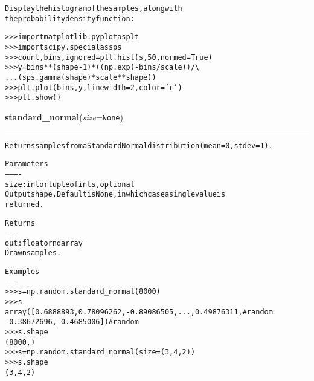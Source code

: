 \begin{boxedminipage}{\funcwidth}
\begin{alltt}
Display the histogram of the samples, along with
the probability density function:

{\textgreater}{\textgreater}{\textgreater} import matplotlib.pyplot as plt
{\textgreater}{\textgreater}{\textgreater} import scipy.special as sps
{\textgreater}{\textgreater}{\textgreater} count, bins, ignored = plt.hist(s, 50, normed=True)
{\textgreater}{\textgreater}{\textgreater} y = bins**(shape-1) * ((np.exp(-bins/scale))/ {\textbackslash}
...                       (sps.gamma(shape) * scale**shape))
{\textgreater}{\textgreater}{\textgreater} plt.plot(bins, y, linewidth=2, color='r')
{\textgreater}{\textgreater}{\textgreater} plt.show()
\end{alltt}

\setlength{\parskip}{1ex}
    \end{boxedminipage}

    \label{QSTK:qstklearn:mldiagnostics:standard_normal}

    \vspace{0.5ex}

\hspace{.8\funcindent}\begin{boxedminipage}{\funcwidth}

    \raggedright \textbf{standard\_normal}(\textit{size}={\tt None})

    \vspace{-1.5ex}

    \rule{\textwidth}{0.5\fboxrule}
\setlength{\parskip}{2ex}
\begin{alltt}
Returns samples from a Standard Normal distribution (mean=0, stdev=1).

Parameters
----------
size : int or tuple of ints, optional
    Output shape. Default is None, in which case a single value is
    returned.

Returns
-------
out : float or ndarray
    Drawn samples.

Examples
--------
{\textgreater}{\textgreater}{\textgreater} s = np.random.standard\_normal(8000)
{\textgreater}{\textgreater}{\textgreater} s
array([ 0.6888893 ,  0.78096262, -0.89086505, ...,  0.49876311, \#random
       -0.38672696, -0.4685006 ])                               \#random
{\textgreater}{\textgreater}{\textgreater} s.shape
(8000,)
{\textgreater}{\textgreater}{\textgreater} s = np.random.standard\_normal(size=(3, 4, 2))
{\textgreater}{\textgreater}{\textgreater} s.shape
(3, 4, 2)
\end{alltt}

\setlength{\parskip}{1ex}
    \end{boxedminipage}

